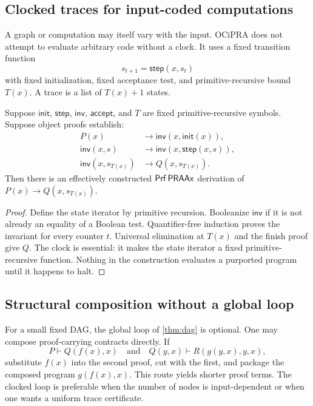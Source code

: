 \subsection{Clocked traces for input-coded computations}

A graph or computation may itself vary with the input.  OCiPRA does not attempt to evaluate arbitrary code without a clock.  It uses a fixed transition function
\[
  s_{t+1}=\mathsf{step}(x,s_t)
\]
with fixed initialization, fixed acceptance test, and primitive-recursive bound \(T(x)\).  A trace is a list of \(T(x)+1\) states.

\begin{theorem}\label{thm:trace}
Suppose \(\mathsf{init}\), \(\mathsf{step}\), \(\mathsf{inv}\), \(\mathsf{accept}\), and \(T\) are fixed primitive-recursive symbols.  Suppose object proofs establish:
\[
\begin{aligned}
 P(x)&\to \mathsf{inv}(x,\mathsf{init}(x)),\\
 \mathsf{inv}(x,s)&\to \mathsf{inv}(x,\mathsf{step}(x,s)),\\
 \mathsf{inv}(x,s_{T(x)})&\to Q(x,s_{T(x)}).
\end{aligned}
\]
Then there is an effectively constructed \(\mathsf{Prf}\,\mathsf{PRAAx}\) derivation of
\(P(x)\to Q(x,s_{T(x)})\).
\end{theorem}

\begin{proof}
Define the state iterator by primitive recursion.  Booleanize \(\mathsf{inv}\) if it is not already an equality of a Boolean test.  Quantifier-free induction proves the invariant for every counter \(t\).  Universal elimination at \(T(x)\) and the finish proof give \(Q\).  The clock is essential: it makes the state iterator a fixed primitive-recursive function.  Nothing in the construction evaluates a purported program until it happens to halt.
\end{proof}

\subsection{Structural composition without a global loop}

For a small fixed DAG, the global loop of \cref{thm:dag} is optional.  One may compose proof-carrying contracts directly.  If
\[
 P\vdash Q(f(x),x)
 \quad\text{and}\quad
 Q(y,x)\vdash R(g(y,x),y,x),
\]
substitute \(f(x)\) into the second proof, cut with the first, and package the composed program \(g(f(x),x)\).  This route yields shorter proof terms.  The clocked loop is preferable when the number of nodes is input-dependent or when one wants a uniform trace certificate.

